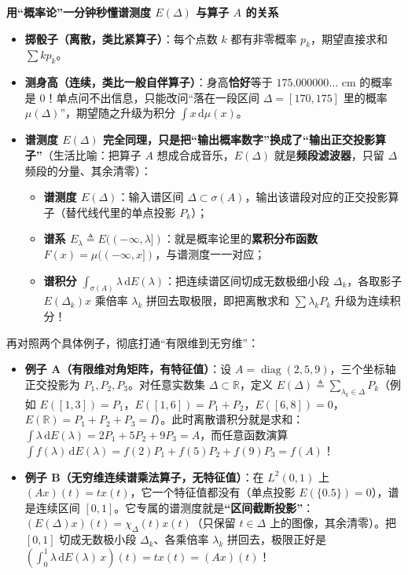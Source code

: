 \documentclass[11pt,a4paper]{article}
\providecommand{\tightlist}{\setlength{\itemsep}{1.8pt}\setlength{\parskip}{0pt}}
\newcommand{\StepHeading}[1]{%
  \Needspace{4\baselineskip}\vspace{4.5pt}\noindent
  {\small\bfseries\color{AccentMain}#1}\par\nopagebreak[4]\vspace{2pt}%
}
\begin{document}
\StepHeading{用``概率论''一分钟秒懂谱测度 \(E(\Delta)\) 与算子 \(A\) 的关系}

\begin{itemize}
\tightlist
\item
  \textbf{掷骰子（离散，类比紧算子）}：每个点数 \(k\) 都有非零概率 \(p_k\)，期望直接求和 \(\sum k p_k\)。
\item
  \textbf{测身高（连续，类比一般自伴算子）}：身高\textbf{恰好}等于 \(175.000000\dots\) cm 的概率是 \textbf{\(0\)}！单点问不出信息，只能改问``落在一段区间 \(\Delta = [170, 175]\) 里的概率 \(\mu(\Delta)\)''，期望随之升级为积分 \(\int x\,\mathrm{d}\mu(x)\)。
\item
  \textbf{谱测度 \(E(\Delta)\) 完全同理，只是把``输出概率数字''换成了``输出正交投影算子''}（生活比喻：把算子 \(A\) 想成合成音乐，\(E(\Delta)\) 就是\textbf{频段滤波器}，只留 \(\Delta\) 频段的分量、其余清零）：

  \begin{itemize}
  \tightlist
  \item
    \textbf{谱测度 \(E(\Delta)\)}：输入谱区间 \(\Delta \subset \sigma(A)\)，输出该谱段对应的正交投影算子（替代线代里的单点投影 \(P_k\)）；
  \item
    \textbf{谱系 \(E_\lambda \triangleq E((-\infty, \lambda])\)}：就是概率论里的\textbf{累积分布函数 \(F(x) = \mu((-\infty, x])\)}，与谱测度一一对应；
  \item
    \textbf{谱积分 \(\int_{\sigma(A)} \lambda\,\mathrm{d}E(\lambda)\)}：把连续谱区间切成无数极细小段 \(\Delta_k\)，各取影子 \(E(\Delta_k)x\) 乘倍率 \(\lambda_k\) 拼回去取极限，即把离散求和 \(\sum \lambda_k P_k\) 升级为连续积分！
  \end{itemize}
\end{itemize}

再对照两个具体例子，彻底打通``有限维到无穷维''：

\begin{itemize}
\tightlist
\item
  \textbf{例子 A（有限维对角矩阵，有特征值）}：设 \(A = \operatorname{diag}(2, 5, 9)\)，三个坐标轴正交投影为 \(P_1, P_2, P_3\)。对任意实数集 \(\Delta \subset \mathbb{R}\)，定义 \(E(\Delta) \triangleq \sum_{\lambda_k \in \Delta} P_k\)（例如 \(E([1,3])=P_1\)，\(E([1,6])=P_1+P_2\)，\(E([6,8])=0\)，\(E(\mathbb{R})=P_1+P_2+P_3=I\)）。此时离散谱积分就是求和：\(\int \lambda\,\mathrm{d}E(\lambda) = 2P_1 + 5P_2 + 9P_3 = A\)，而任意函数演算 \(\int f(\lambda)\,\mathrm{d}E(\lambda) = f(2)P_1 + f(5)P_2 + f(9)P_3 = f(A)\)！
\item
  \textbf{例子 B（无穷维连续谱乘法算子，无特征值）}：在 \(L^2(0,1)\) 上 \((Ax)(t) = t x(t)\)，它一个特征值都没有（单点投影 \(E(\{0.5\})=0\)），谱是连续区间 \([0,1]\)。它专属的谱测度就是\textbf{``区间截断投影''}：\((E(\Delta)x)(t) = \chi_\Delta(t)x(t)\)（只保留 \(t\in\Delta\) 上的图像，其余清零）。把 \([0,1]\) 切成无数极小段 \(\Delta_k\)、各乘倍率 \(\lambda_k\) 拼回去，极限正好是 \(\left(\int_0^1 \lambda\,\mathrm{d}E(\lambda)\,x\right)(t) = t x(t) = (Ax)(t)\)！
\end{itemize}
\end{document}
